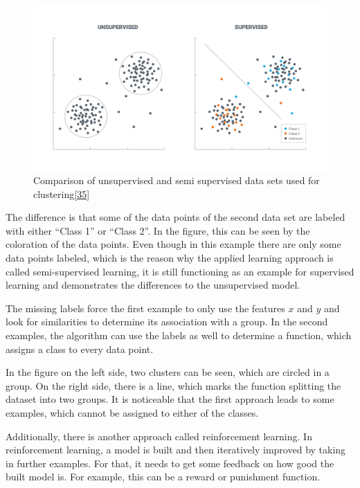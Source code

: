 \documentclass[12pt,english,a4paper,oneside,,tablecaptionabove]{scrbook}
\begin{document}
\begin{figure}
\hypertarget{fig:training_comparison}{%
\centering
\includegraphics[width=6.25in,height=\textheight]{images/chapter2/training_comparison.png}
\caption{Comparison of unsupervised and semi supervised data sets used
for
clustering{[}\protect\hyperlink{ref-AmnahKhatun}{35}{]}}\label{fig:training_comparison}
}
\end{figure}

The difference is that some of the data points of the second data set
are labeled with either \enquote{Class 1} or \enquote{Class 2}. In the
figure, this can be seen by the coloration of the data points. Even
though in this example there are only some data points labeled, which is
the reason why the applied learning approach is called semi-supervised
learning, it is still functioning as an example for supervised learning
and demonstrates the differences to the unsupervised model.

The missing labels force the first example to only use the features
\(x\) and \(y\) and look for similarities to determine its association
with a group. In the second examples, the algorithm can use the labels
as well to determine a function, which assigns a class to every data
point.

In the figure on the left side, two clusters can be seen, which are
circled in a group. On the right side, there is a line, which marks the
function splitting the dataset into two groups. It is noticeable that
the first approach leads to some examples, which cannot be assigned to
either of the classes.

Additionally, there is another approach called reinforcement learning.
In reinforcement learning, a model is built and then iteratively
improved by taking in further examples. For that, it needs to get some
feedback on how good the built model is. For example, this can be a
reward or punishment function.
\end{document}
